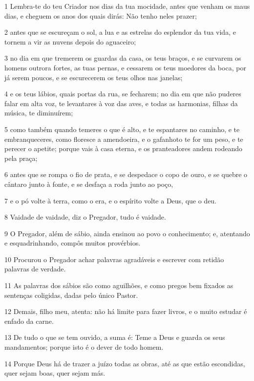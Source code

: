\par 1 Lembra-te do teu Criador nos dias da tua mocidade, antes que venham os maus dias, e cheguem os anos dos quais dirás: Não tenho neles prazer;
\par 2 antes que se escureçam o sol, a lua e as estrelas do esplendor da tua vida, e tornem a vir as nuvens depois do aguaceiro;
\par 3 no dia em que tremerem os guardas da casa, os teus braços, e se curvarem os homens outrora fortes, as tuas pernas, e cessarem os teus moedores da boca, por já serem poucos, e se escurecerem os teus olhos nas janelas;
\par 4 e os teus lábios, quais portas da rua, se fecharem; no dia em que não puderes falar em alta voz, te levantares à voz das aves, e todas as harmonias, filhas da música, te diminuírem;
\par 5 como também quando temeres o que é alto, e te espantares no caminho, e te embranqueceres, como floresce a amendoeira, e o gafanhoto te for um peso, e te perecer o apetite; porque vais à casa eterna, e os pranteadores andem rodeando pela praça;
\par 6 antes que se rompa o fio de prata, e se despedace o copo de ouro, e se quebre o cântaro junto à fonte, e se desfaça a roda junto ao poço,
\par 7 e o pó volte à terra, como o era, e o espírito volte a Deus, que o deu.
\par 8 Vaidade de vaidade, diz o Pregador, tudo é vaidade.
\par 9 O Pregador, além de sábio, ainda ensinou ao povo o conhecimento; e, atentando e esquadrinhando, compôs muitos provérbios.
\par 10 Procurou o Pregador achar palavras agradáveis e escrever com retidão palavras de verdade.
\par 11 As palavras dos sábios são como aguilhões, e como pregos bem fixados as sentenças coligidas, dadas pelo único Pastor.
\par 12 Demais, filho meu, atenta: não há limite para fazer livros, e o muito estudar é enfado da carne.
\par 13 De tudo o que se tem ouvido, a suma é: Teme a Deus e guarda os seus mandamentos; porque isto é o dever de todo homem.
\par 14 Porque Deus há de trazer a juízo todas as obras, até as que estão escondidas, quer sejam boas, quer sejam más.


